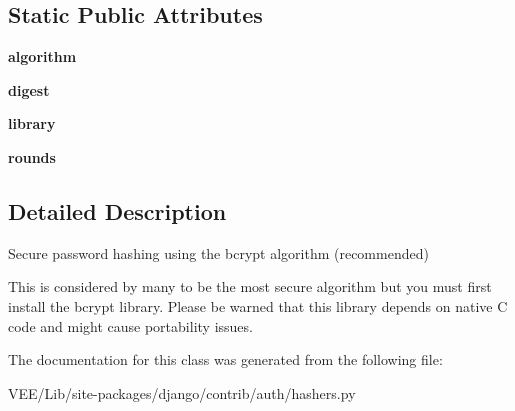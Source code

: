 \subsection*{Static Public Attributes}
\begin{DoxyCompactItemize}
\item 
\mbox{\label{classdjango_1_1contrib_1_1auth_1_1hashers_1_1_b_crypt_s_h_a256_password_hasher_a8a10c384b05ccc20ca0ab69e592ed21d}} 
{\bfseries algorithm}
\item 
\mbox{\label{classdjango_1_1contrib_1_1auth_1_1hashers_1_1_b_crypt_s_h_a256_password_hasher_a182be5d3270f3583153ca70860e3ba56}} 
{\bfseries digest}
\item 
\mbox{\label{classdjango_1_1contrib_1_1auth_1_1hashers_1_1_b_crypt_s_h_a256_password_hasher_a1c45d4cb1f16ba252b2bfabf836fbfd4}} 
{\bfseries library}
\item 
\mbox{\label{classdjango_1_1contrib_1_1auth_1_1hashers_1_1_b_crypt_s_h_a256_password_hasher_af481a618673ae09c2519e73bb458bba2}} 
{\bfseries rounds}
\end{DoxyCompactItemize}


\subsection{Detailed Description}
\begin{DoxyVerb}Secure password hashing using the bcrypt algorithm (recommended)

This is considered by many to be the most secure algorithm but you
must first install the bcrypt library.  Please be warned that
this library depends on native C code and might cause portability
issues.
\end{DoxyVerb}
 

The documentation for this class was generated from the following file\+:\begin{DoxyCompactItemize}
\item 
V\+E\+E/\+Lib/site-\/packages/django/contrib/auth/hashers.\+py\end{DoxyCompactItemize}
